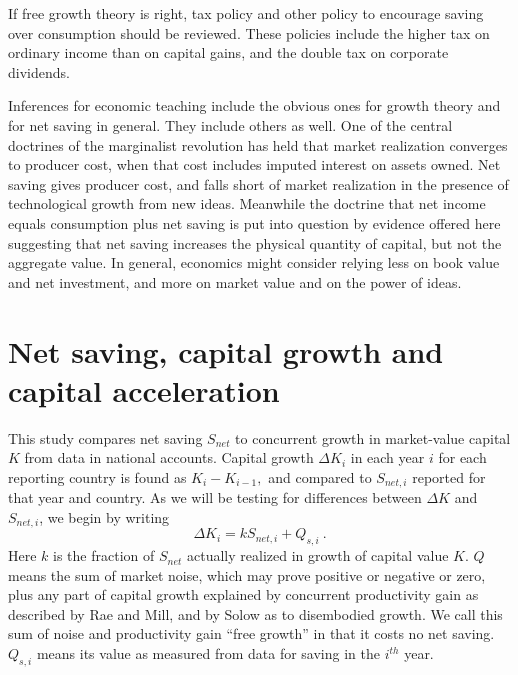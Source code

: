 \documentclass[a4paper,fleqn]{latex_styles/cas-sc}
\begin{document}
If free growth theory is right, tax policy and other policy to encourage
saving over consumption should be reviewed. These policies
include the higher tax on ordinary income than on capital gains, and the
double tax on corporate dividends.

Inferences for economic teaching include the obvious ones for growth
theory and for net saving in general. They include others as well.
One of the central doctrines of the marginalist revolution has held that
market realization converges to producer cost, when that cost includes
imputed interest on assets owned. Net saving gives producer cost,
and falls short of market realization in the presence of technological
growth from new ideas. Meanwhile the doctrine that net income equals
consumption plus net saving is put into question by evidence offered
here suggesting that net saving increases the physical quantity of
capital, but not the aggregate value. In general, economics might
consider relying less on book value and net investment, and more on market value and on the
power of ideas.

\hypertarget{net-saving-and-capital-growth}{%
\section{Net saving, capital growth and capital acceleration}\label{net-saving-and-capital-growth}}

This study compares net saving \(S_{net}\) to concurrent growth in
market-value capital \(K\) from data in national accounts. Capital
growth \({\Delta K}_{i}\) in each year \(i\) for each reporting country
is found as \(K_{i} - K_{i - 1},\) and compared to \(S_{net,i}\)
reported for that year and country. As we will be testing for
differences between \(\Delta K\) and \(S_{net,i}\), we begin by writing
%
\begin{equation}
\Delta K_{i} = k S_{net,i} + Q_{s,i}\ .\label{eq-1}
\end{equation}
%
Here \(k\) is the fraction of \(S_{net}\) actually realized in growth of capital value \(K\). \(Q\) means the sum of market noise, which may prove
positive or negative or zero, plus any part of capital growth explained
by concurrent productivity gain as described by Rae and Mill, and by
Solow as to disembodied growth. We call this sum of noise and
productivity gain ``free growth'' in that it costs no net saving.
\(Q_{s,i}\) means its value as measured from data for saving in the \(i^{th}\) year.
\end{document}
